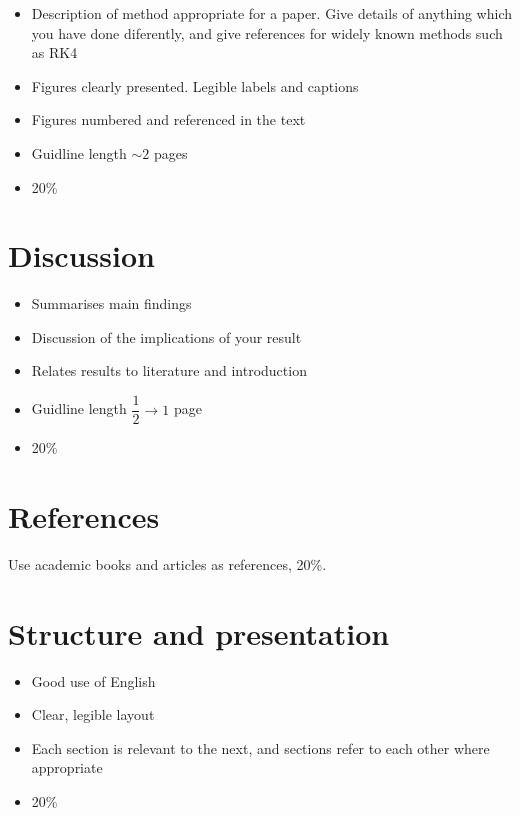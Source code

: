 \documentclass[aip,apl]{revtex4-1}
\begin{document}
	
	\begin{itemize}
		\item Description of method appropriate for a paper. Give details of anything which you have done diferently, and give references for widely known methods such as RK4
		\item Figures clearly presented. Legible labels and captions
		\item Figures numbered and referenced in the text
		\item Guidline length $\sim 2$ pages
		\item 20\%
	\end{itemize}
	
	\section{Discussion}
	\begin{itemize}
		\item Summarises main findings
		\item Discussion of the implications of your result
		\item Relates results to literature and introduction
		\item Guidline length $ \dfrac{1}{2} \to 1 $ page
		\item 20\%
	\end{itemize}
	
	\section{References}
	Use academic books and articles as references, 20\%.
	
	\section{Structure and presentation}
	\begin{itemize}
		\item Good use of English
		\item Clear, legible layout
		\item Each section is relevant to the next, and sections refer to each other where appropriate
		\item 20\%
	\end{itemize}
	
\end{document}
